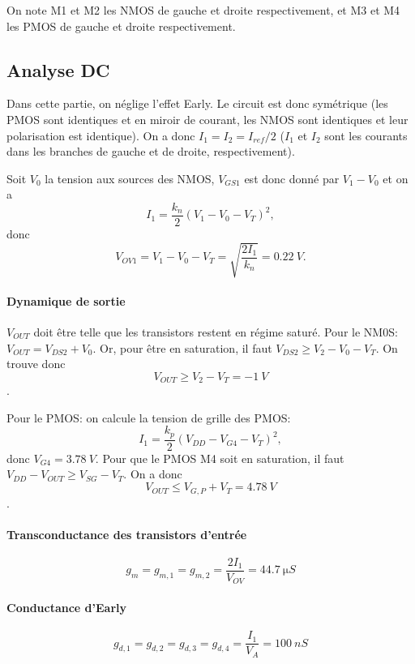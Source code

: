 \documentclass[frenchb,DIV=14]{scrartcl}
\begin{document}
On note M1 et M2 les NMOS de gauche et droite respectivement, et M3 et M4 les PMOS
de gauche et droite respectivement.

\subsection*{Analyse DC}

Dans cette partie, on néglige l'effet Early. Le circuit est donc symétrique (les PMOS
sont identiques et en miroir de courant, les NMOS sont identiques et leur polarisation
est identique). On a donc $I_1 = I_2 = I_{ref}/2$ ($I_1$ et $I_2$ sont les courants dans
les branches de gauche et de droite, respectivement).

Soit $V_0$ la tension aux sources des NMOS, $V_{GS1}$ est donc donné
par $V_1-V_0$ et on a
\[I_1 = \frac{k_n}{2}\left(V_1-V_0-V_T\right)^2,\]
donc
\[V_{OV1} = V_1-V_0-V_T = \sqrt{\frac{2I_1}{k_n}} = \SI{0.22}{V}.\]

\paragraph{Dynamique de sortie}
$V_{OUT}$ doit être telle que les transistors restent
en régime saturé. Pour le NM0S: $V_{OUT} = V_{DS2} + V_0$.
Or, pour être en saturation, il faut $V_{DS2} \ge V_2 - V_0 - V_T$.
On trouve donc
\[V_{OUT} \ge V_2 - V_T = \SI{-1}{V}\].

Pour le PMOS: on calcule la tension de grille des PMOS:
\[I_1 = \frac{k_p}{2}\left(V_{DD}-V_{G4}-V_T\right)^2,\]
donc $V_{G4} = \SI{3.78}{V}$. Pour que le PMOS M4 soit en
saturation, il faut $V_{DD} - V_{OUT} \ge V_{SG} - V_T$.
On a donc
\[V_{OUT} \le V_{G,P}+V_T = \SI{4.78}{V}\].

\paragraph{Transconductance des transistors d'entrée}
\[g_m = g_{m,1} = g_{m,2} = \frac{2I_1}{V_{OV}} = \SI{44.7}{\micro S}\]

\paragraph{Conductance d'Early}
\[g_{d,1} = g_{d,2} = g_{d,3} = g_{d,4} = \frac{I_1}{V_A} = \SI{100}{nS}\]
\end{document}
